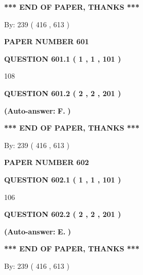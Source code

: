 \documentclass{ctexart}
\begin{document}
 
   
   
   
   
\vspace{1.0in} 
{\textbf{\large{ *** END OF PAPER, THANKS *** }}} 
   
   
\hspace{1.0in} By: 
 239 ( 416 ,  613 )
   
   
   
   
\newpage 
\setcounter{page}{ 
   601001 } 
   
   
 {\textbf{ \Large{ PAPER NUMBER  601  }}}
   
   
   
   
  
  
{\textbf{\large{QUESTION
601.1 
 ( 1 , 1 , 101 )
}}}

108
  
  
{\textbf{\large{QUESTION
601.2 
 ( 2 , 2 , 201 )
}}}
 
 
{\textbf{(Auto-answer:}}
{\textbf{\large{
F.}}}
{\textbf{)}}
 
 
   
   
   
   
\vspace{1.0in} 
{\textbf{\large{ *** END OF PAPER, THANKS *** }}} 
   
   
\hspace{1.0in} By: 
 239 ( 416 ,  613 )
   
   
   
   
\newpage 
\setcounter{page}{ 
   602001 } 
   
   
 {\textbf{ \Large{ PAPER NUMBER  602  }}}
   
   
   
   
  
  
{\textbf{\large{QUESTION
602.1 
 ( 1 , 1 , 101 )
}}}

106
  
  
{\textbf{\large{QUESTION
602.2 
 ( 2 , 2 , 201 )
}}}
 
 
{\textbf{(Auto-answer:}}
{\textbf{\large{
E.}}}
{\textbf{)}}
 
 
   
   
   
   
\vspace{1.0in} 
{\textbf{\large{ *** END OF PAPER, THANKS *** }}} 
   
   
\hspace{1.0in} By: 
 239 ( 416 ,  613 )
   
   
   
   
\newpage 
\setcounter{page}{ 
   603001 } 
   
\end{document}
